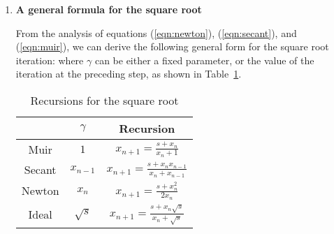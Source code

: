 \begin {enumerate}
\par
Another possible iterative relation for the square root is Francis
Muir's, described by \cite{Claerbout.bei.95}:
\beq \label{eqn:muir}
 \eeq
\par
This relation belongs to the same family of iterative schemes as
Newton and Secant, if we make the following special choice of the
function $f(x)$ in (\ref{eqn:newton-raphson}):
\beq \label{eqn:muf} 
f(x)= 
|x+|^{}
|x-|^{} \eeq
\par
Figure~\ref{fig:muf} is a graphical representation of the
function f(x).
\item {\bf A general formula for the square root}
\par
From the analysis of equations (\ref{eqn:newton}), (\ref{eqn:secant}),
and (\ref{eqn:muir}), we can derive the following general form for 
the square root iteration:
\beq \label{eqn:general}
 \eeq
where $\gamma$ can be either a fixed parameter, or the value of the
iteration at the preceding step, as shown in Table~\ref{recursion}. 
\begin{table} \center
\caption{Recursions for the square root}
\label{recursion}
\begin{tabular}{|c|c|c|}\hline
\R        & $\gamma$   & Recursion \\\hline
\R Muir   & $1$        & $x_{n+1}=\frac{s+x_n        }{x_n+1       }$ \\\hline
\R Secant & $x_{n-1}$  & $x_{n+1}=\frac{s+x_n x_{n-1}}{x_n+x_{n-1} }$ \\\hline
\R Newton & $x_n$      & $x_{n+1}=\frac{s+x_n^2      }{2  x_n      }$ \\\hline
\R Ideal  & $\sqrt{s}$ & $x_{n+1}=\frac{s+x_n\sqrt{s}}{x_n+\sqrt{s}}$ \\\hline
\end{tabular}
\end{table}

\end{enumerate}
